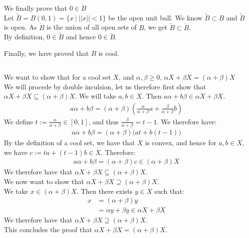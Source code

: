\documentclass{article}
\begin{document}
We finally prove that $0 \in \mathring{B}$ \\
Let $\widetilde{B}=B(0,1) = \{x \ | \  ||x|| < 1 \}$ be the open unit ball. We know $\widetilde{B} \subset B$ and $\widetilde{B}$ is open. As $\mathring{B}$ is the union of all open sets of $B$, we get $\widetilde{B} \subset \mathring{B}$. \\
By definition, $0 \in \widetilde{B}$ and hence $0 \in \mathring{B}$. 

\noindent Finally, we have proved that $B$ is cool.





\subsection{}%
We want to show that for a cool set $X$, and $\alpha,\beta \geq 0, \, \alpha X + \beta X = (\alpha + \beta )X$\\
We will procede by double inculsion, let us therefore first show that $\alpha X + \beta X \subseteq (\alpha + \beta )X$. We will take $a,b \in X$. Then $a\alpha + b\beta \in  \alpha X + \beta X$.
\begin{align*}
	a\alpha + b\beta = (\alpha + \beta )\left( \frac{\alpha}{\alpha + \beta}a +  \frac{\beta}{\alpha + \beta}b \right)
\end{align*}
We define $t := \frac{\alpha}{\alpha + \beta} \in [0,1]$, and thus $\frac{\beta}{\alpha + \beta} = t-1$. We therefore have:
\begin{align*}
	a\alpha + b\beta = (\alpha + \beta )\big(at + b(t-1)\big)
\end{align*}
By the definition of a cool set, we have that $X$ is convex, and hence for $a,b \in X$, we have $c:=ta + (t-1)b \in X$. Therefore:
\begin{align*}
	a\alpha + b\beta = (\alpha + \beta )c \in (\alpha + \beta )X
\end{align*}
We therefore have that $\alpha X + \beta X \subseteq (\alpha + \beta )X$.\\We now want to show that $\alpha X + \beta X \supseteq (\alpha + \beta )X$.\\ We take $x \in (\alpha + \beta )X$. Then there exists $y \in X$ such that:
\begin{align*}
	x &= (\alpha + \beta )y\\
	&= \alpha y + \beta y \in \alpha X + \beta X
\end{align*}
We therefore have that $\alpha X + \beta X \supseteq (\alpha + \beta )X$.\\ This concludes the proof that $\alpha X + \beta X = (\alpha + \beta )X$.
\end{document}
